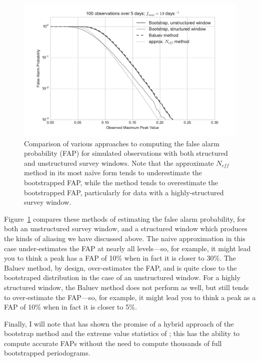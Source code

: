 \documentclass[preprint]{aastex}
\newcommand{\fig}[1]{Figure~\ref{fig:#1}}
\newcommand{\figlabel}[1]{\label{fig:#1}}
\begin{document}
\begin{figure}[ht]
  \centering
  \includegraphics[width=\textwidth]{fig27_FAP_bootstrap}
  \caption{Comparison of various approaches to computing the false alarm
    probability (FAP) for simulated observations with both structured and
    unstructured survey windows. Note that the approximate $N_{eff}$ method
    in its most na{\"i}ve form tends to underestimate the bootstrapped FAP,
    while the \citet{Baluev2008} method tends to overestimate the bootstrapped
    FAP, particularly for data with a highly-structured survey window.
    \figlabel{FAP-bootstrap}}
\end{figure}

\fig{FAP-bootstrap} compares these methods of estimating the false alarm
probability, for both an unstructured survey window, and a structured window
which produces the kinds of aliasing we have discussed above.
The naive approximation in this case under-estimates the FAP at nearly all
levels---so, for example, it might lead you to think a peak has a FAP of 10\%
when in fact it is closer to 30\%.
The Baluev method, by design, over-estimates the FAP, and is quite close to
the bootstraped distribution in the case of an unstructured window.
For a highly structured window, the Baluev method does not perform as well,
but still tends to over-estimate the FAP---so, for example, it might lead you
to think a peak as a FAP of 10\% when in fact it is closer to 5\%.

Finally, I will note that \citet{Suveges12} has shown the promise of a
hybrid approach of the bootstrap method and the extreme value statistics
of \citet{Baluev2008}; this has the ability to compute accurate FAPs
without the need to compute thousands of full bootstrapped periodograms.
\end{document}

